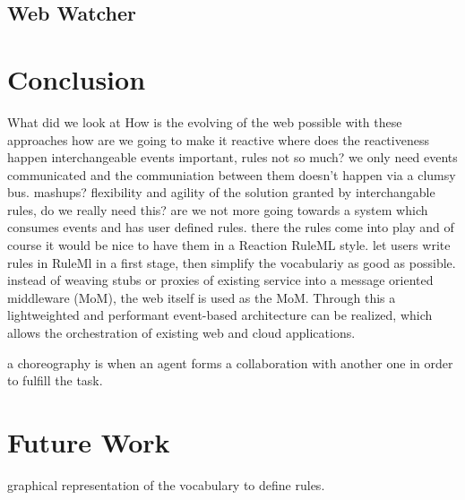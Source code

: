 \documentclass[11pt]{article}%
\begin{document}
\subsection{Web Watcher}


\section{Conclusion}
What did we look at
How is the evolving of the web possible with these approaches
how are we going to make it reactive
where does the reactiveness happen
interchangeable events important, rules not so much?
we only need events communicated and the communiation between them doesn't happen via a clumsy bus.
mashups?
flexibility and agility of the solution granted by interchangable rules, do we really need this?
are we not more going towards a system which consumes events and has user defined rules.
there the rules come into play and of course it would be nice to have them in a Reaction RuleML style.
let users write rules in  RuleMl in a first stage, then simplify the vocabulariy as good as possible.
instead of weaving stubs or proxies of existing service into a message oriented middleware (MoM), the web itself is used as the MoM. Through this a lightweighted and performant event-based architecture can be realized, which allows the orchestration of existing web and cloud applications.

a choreography is when an agent forms a collaboration with another one in order to fulfill the task.

\section{Future Work}

graphical representation of the vocabulary to define rules.





\newpage
\appendix
\renewcommand\thesection{Appendix \Alph{section}\ \ \ --}
\end{document}

